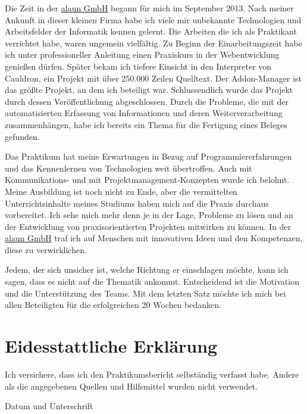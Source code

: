 \documentclass[12pt]{article}
\begin{document}
Die Zeit in der \href{https://alaun.de/home/}{alaun GmbH} begann für mich im September 2013. Nach meiner
Ankunft in dieser kleinen Firma habe ich viele mir unbekannte Technologien und 
Arbeitsfelder der Informatik kennen gelernt. Die Arbeiten die ich als Praktikant verrichtet habe, waren ungemein
vielfältig. Zu Beginn der Einarbeitungszeit habe ich unter professioneller Anleitung einen Praxiskurs in der Webentwicklung
genießen dürfen. Später bekam ich tiefere Einsicht in den Interpreter von Cauldron, ein Projekt mit über 250.000 Zeilen
Quelltext. Der Addon-Manager ist das größte Projekt, an dem ich beteiligt war. Schlussendlich wurde das Projekt durch dessen
Veröffentlichung abgeschlossen. Durch die Probleme, die mit der automatisierten Erfassung von Informationen und deren Weiterverarbeitung zusammenhängen, habe ich bereits ein Thema für die Fertigung eines Beleges gefunden.

Das Praktikum hat meine Erwartungen in Bezug auf Programmiererfahrungen und das Kennenlernen von Technologien weit übertroffen.
Auch mit Kommunikations- und mit Projektmanagement-Konzepten wurde ich belohnt. Meine Ausbildung ist noch nicht zu Ende, aber
die vermittelten Unterrichtsinhalte meines Studiums haben mich auf die Praxis durchaus vorbereitet.
Ich sehe mich mehr denn je in der Lage, Probleme zu lösen und an der Entwicklung von praxisorientierten Projekten mitwirken zu können.
In der \href{https://alaun.de/home/}{alaun GmbH} traf ich auf Menschen mit innovativen Ideen und den Kompetenzen, diese
zu verwirklichen.

Jedem, der sich unsicher ist, welche Richtung er einschlagen möchte, kann ich sagen, dass es nicht auf die Thematik ankommt.
Entscheidend ist die Motivation und die Unterstützung des Teams.
Mit dem letzten Satz möchte ich mich bei allen Beteiligten für die erfolgreichen 20 Wochen bedanken.

\newpage

\section{Eidesstattliche Erklärung}

Ich versichere, dass ich den Praktikumsbericht selbständig verfasst habe. Andere als die angegebenen Quellen und Hilfsmittel wurden nicht verwendet.

\vspace*{3cm}

\noindent Datum und Unterschrift
\end{document}
